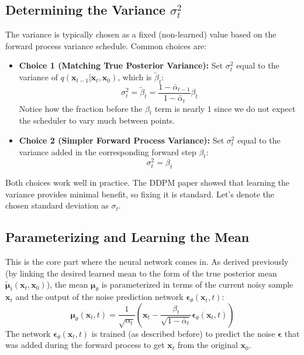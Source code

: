 \documentclass{article}
\newcommand{\bx}{\bm{x}}
\newcommand{\bmu}{\bm{\mu}}
\newcommand{\bepsilon}{\bm{\epsilon}}
\begin{document}
\subsection{Determining the Variance $\sigma_t^2$}

The variance is typically chosen as a fixed (non-learned) value based on the forward process variance schedule. Common choices are:
\begin{itemize}
    \item \textbf{Choice 1 (Matching True Posterior Variance):} Set $\sigma_t^2$ equal to the variance of $q(\bx_{t-1} | \bx_t, \bx_0)$, which is $\tilde{\beta}_t$:
      \begin{equation}
          \sigma_t^2 = \tilde{\beta}_t = \frac{1 - \bar{\alpha}_{t-1}}{1 - \bar{\alpha}_t} \beta_t
      \end{equation}
      Notice how the fraction before the $\beta_t$ term is nearly $1$ since we do not expect the scheduler to vary much between points.
    \item \textbf{Choice 2 (Simpler Forward Process Variance):} Set $\sigma_t^2$ equal to the variance added in the corresponding forward step $\beta_t$:
      \begin{equation}
          \sigma_t^2 = \beta_t
      \end{equation}
\end{itemize}
Both choices work well in practice. The DDPM paper showed that learning the variance provides minimal benefit, so fixing it is standard. Let's denote the chosen standard deviation as $\sigma_t$.

\subsection{Parameterizing and Learning the Mean}

This is the core part where the neural network comes in. As derived previously (by linking the desired learned mean to the form of the true posterior mean $\tilde{\bmu}_t(\bx_t, \bx_0)$), the mean $\bmu_\theta$ is parameterized in terms of the current noisy sample $\bx_t$ and the output of the noise prediction network $\bepsilon_\theta(\bx_t, t)$:
\begin{equation} \label{eq:mean_param}
    \bmu_\theta(\bx_t, t) = \frac{1}{\sqrt{\alpha_t}} \left( \bx_t - \frac{\beta_t}{\sqrt{1 - \bar{\alpha}_t}} \bepsilon_\theta(\bx_t, t) \right)
\end{equation}
The network $\bepsilon_\theta(\bx_t, t)$ is trained (as described before) to predict the noise $\bepsilon$ that was added during the forward process to get $\bx_t$ from the original $\bx_0$.
\end{document}
